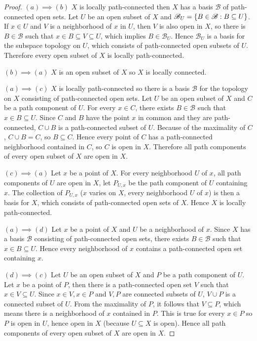 \begin{proof}
	$(a)\implies (b)$ $X$ is locally path-connected then $X$ has a basis $\mathscr{B}$ of path-connected open sets. Let $U$ be an open subset of $X$ and $\mathscr{B}_{U} = \left\{{ B\in \mathscr{B} : B\subseteq U }\right\}$. If $x\in U$ and $V$ is a neighborhood of $x$ in $U$, then $V$ is also open in $X$, so there is $B\in\mathscr{B}$ such that $x\in B\subseteq V\subseteq U$, which implies $B\in\mathscr{B}_{U}$. Hence $\mathscr{B}_{U}$ is a basis for the subspace topology on $U$, which consists of path-connected open subsets of $U$. Therefore every open subset of $X$ is locally path-connected.

	$(b)\implies (a)$ $X$ is an open subset of $X$ so $X$ is locally connected.

	$(a)\implies (c)$ $X$ is locally path-connected so there is a basis $\mathscr{B}$ for the topology on $X$ consisting of path-connected open sets. Let $U$ be an open subset of $X$ and $C$ be a path component of $U$. For every $x\in C$, there exists $B\in\mathscr{B}$ such that $x\in B \subseteq U$. Since $C$ and $B$ have the point $x$ in common and they are path-connected, $C\cup B$ is a path-connected subset of $U$. Because of the maximality of $C$, $C\cup B = C$, so $B\subseteq C$. Hence every point of $C$ has a path-connected neighborhood contained in $C$, so $C$ is open in $X$. Therefore all path components of every open subset of $X$ are open in $X$.

	$(c)\implies (a)$ Let $x$ be a point of $X$. For every neighborhood $U$ of $x$, all path components of $U$ are open in $X$, let $P_{U,x}$ be the path component of $U$ containing $x$. The collection of $P_{U,x}$ ($x$ varies on $X$, every neighborhood $U$ of $x$) is then a basis for $X$, which consists of path-connected open sets of $X$. Hence $X$ is locally path-connected.

	$(a)\implies (d)$ Let $x$ be a point of $X$ and $U$ be a neighborhood of $x$. Since $X$ has a basis $\mathscr{B}$ consisting of path-connected open sets, there exists $B\in\mathscr{B}$ such that $x \in B\subseteq U$. Hence every neighborhood of $x$ contains a path-connected open set containing $x$.

	$(d)\implies (c)$ Let $U$ be an open subset of $X$ and $P$ be a path component of $U$. Let $x$ be a point of $P$, then there is a path-connected open set $V$ such that $x\in V\subseteq U$. Since $x\in V, x\in P$ and $V, P$ are connected subsets of $U$, $V\cup P$ is a connected subset of $U$. From the maximality of $P$, it follows that $V\subseteq P$, which means there is a neighborhood of $x$ contained in $P$. This is true for every $x\in P$ so $P$ is open in $U$, hence open in $X$ (because $U\subseteq X$ is open). Hence all path components of every open subset of $X$ are open in $X$.


\end{proof}
